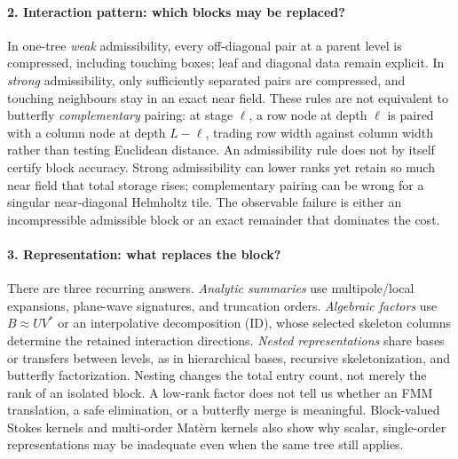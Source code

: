 \documentclass[11pt,a4paper]{article}
\begin{document}
\paragraph{2. Interaction pattern: which blocks may be replaced?}
In one-tree \emph{weak} admissibility, every off-diagonal pair at a parent level is compressed, including touching boxes; leaf and diagonal data remain explicit. In \emph{strong} admissibility, only sufficiently separated pairs are compressed, and touching neighbours stay in an exact near field. These rules are not equivalent to butterfly \emph{complementary} pairing: at stage $\ell$, a row node at depth $\ell$ is paired with a column node at depth $L-\ell$, trading row width against column width rather than testing Euclidean distance. An admissibility rule does not by itself certify block accuracy. Strong admissibility can lower ranks yet retain so much near field that total storage rises; complementary pairing can be wrong for a singular near-diagonal Helmholtz tile. The observable failure is either an incompressible admissible block or an exact remainder that dominates the cost.

\paragraph{3. Representation: what replaces the block?}
There are three recurring answers. \emph{Analytic summaries} use multipole/local expansions, plane-wave signatures, and truncation orders. \emph{Algebraic factors} use $B\approx UV^*$ or an interpolative decomposition (ID), whose selected skeleton columns determine the retained interaction directions. \emph{Nested representations} share bases or transfers between levels, as in hierarchical bases, recursive skeletonization, and butterfly factorization. Nesting changes the total entry count, not merely the rank of an isolated block. A low-rank factor does not tell us whether an FMM translation, a safe elimination, or a butterfly merge is meaningful. Block-valued Stokes kernels and multi-order Mat\`ern kernels also show why scalar, single-order representations may be inadequate even when the same tree still applies.
\end{document}

